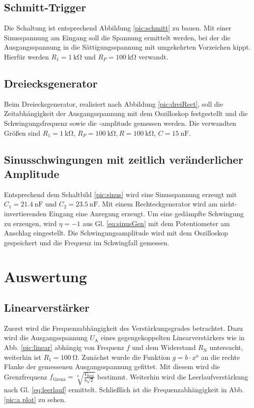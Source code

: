 \subsection{Schmitt-Trigger}
Die Schaltung ist entsprechend Abbildung \ref{pic:schmitt} zu bauen.
Mit einer Sinusspannung am Eingang soll die Spannung ermittelt werden,
bei der die Ausgangsspannung in die Sättigungsspannung mit umgekehrten
Vorzeichen kippt. Hierfür werden $R_1 = \SI{1}{\kilo\ohm}$ und
$R_P = \SI{100}{\kilo\ohm}$ verwandt.

\subsection{Dreiecksgenerator}
Beim Dreiecksgenerator, realisiert nach Abbildung \ref{pic:dreiRect},
soll die Zeitabhängigkeit der Ausgangsspannung mit dem Oszilloskop
festgestellt und die Schwingungsfrequenz sowie die -amplitude gemessen werden.
Die verwandten Größen sind $R_1 = \SI{1}{\kilo\ohm}$, $R_P = \SI{100}{\kilo\ohm},
R= \SI{100}{\kilo\ohm}$, $C = \SI{15}{\nano\farad}$.

\subsection{Sinusschwingungen mit zeitlich veränderlicher Amplitude}
Entsprechend dem Schaltbild \ref{pic:sinus} wird eine Sinusspannung
erzeugt mit $C_1 = \SI{21,4}{\nano\farad}$ und $C_2  = \SI{23,5}{\nano\farad}$.
Mit einem Rechteckgenerator wird am nicht-invertierenden Eingang
eine Anregung erzeugt. Um eine gedämpfte Schwingung zu erzeugen, wird $\eta = -1$ 
aus Gl. \eqref{eq:sinusGen} mit dem Potentiometer am Anschlag eingestellt.
Die Schwingungsamplitude wird mit dem Oszilloskop gespeichert und
die Frequenz im Schwingfall gemessen.



\section{Auswertung}
\subsection{Linearverstärker}
Zuerst wird die Frequenzabhängigkeit des Verstärkungsgrades betrachtet. Dazu wird die Ausgangsspannung $U_\text{A}$ eines gegengekoppelten Linearverstärkers wie in Abb. \ref{pic:linear} abhängig von Frequenz $f$ und dem Widerstand $R_\text{N}$ untersucht, weiterhin ist $R_1 = 100\ \si{\ohm}$. Zunächst wurde die Funktion $g = b \cdot x^a$ an die rechte Flanke der gemessenen Ausgangsspannung gefittet. Mit diesem wird die Grenzfrequenz $f_\text{Grenz} =\sqrt[a]{\frac{V_\text{Real}}{b\sqrt{2}}}$ bestimmt. Weiterhin wird die Leerlaufverstärkung nach Gl. \ref{eq:leerlauf} ermittelt. Schließlich ist die Frequenzabhängigkeit in Abb. \ref{pic:a plot} zu sehen.

